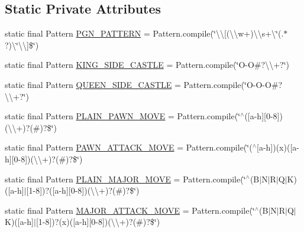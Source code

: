 \subsection*{Static Private Attributes}
\begin{DoxyCompactItemize}
\item 
static final Pattern \mbox{\hyperlink{classcom_1_1chess_1_1pgn_1_1_p_g_n_utilities_a8f958e8212e6a3b3079fc2ef9a319761}{P\+G\+N\+\_\+\+P\+A\+T\+T\+E\+RN}} = Pattern.\+compile(\char`\"{}\textbackslash{}\textbackslash{}\mbox{[}(\textbackslash{}\textbackslash{}w+)\textbackslash{}\textbackslash{}s+\textbackslash{}\char`\"{}(.$\ast$?)\textbackslash{}\char`\"{}\textbackslash{}\textbackslash{}\mbox{]}\$\char`\"{})
\item 
static final Pattern \mbox{\hyperlink{classcom_1_1chess_1_1pgn_1_1_p_g_n_utilities_a67582116b089ac50a96afca81e4deca0}{K\+I\+N\+G\+\_\+\+S\+I\+D\+E\+\_\+\+C\+A\+S\+T\+LE}} = Pattern.\+compile(\char`\"{}O-\/O\#?\textbackslash{}\textbackslash{}+?\char`\"{})
\item 
static final Pattern \mbox{\hyperlink{classcom_1_1chess_1_1pgn_1_1_p_g_n_utilities_a917072145ceea754cb8cd86d1683e19d}{Q\+U\+E\+E\+N\+\_\+\+S\+I\+D\+E\+\_\+\+C\+A\+S\+T\+LE}} = Pattern.\+compile(\char`\"{}O-\/O-\/O\#?\textbackslash{}\textbackslash{}+?\char`\"{})
\item 
static final Pattern \mbox{\hyperlink{classcom_1_1chess_1_1pgn_1_1_p_g_n_utilities_a638924016bd8ee5265515487b596a4e7}{P\+L\+A\+I\+N\+\_\+\+P\+A\+W\+N\+\_\+\+M\+O\+VE}} = Pattern.\+compile(\char`\"{}$^\wedge$(\mbox{[}a-\/h\mbox{]}\mbox{[}0-\/8\mbox{]})(\textbackslash{}\textbackslash{}+)?(\#)?\$\char`\"{})
\item 
static final Pattern \mbox{\hyperlink{classcom_1_1chess_1_1pgn_1_1_p_g_n_utilities_a92b5b12f318218f69e63facf7dc9017c}{P\+A\+W\+N\+\_\+\+A\+T\+T\+A\+C\+K\+\_\+\+M\+O\+VE}} = Pattern.\+compile(\char`\"{}($^\wedge$\mbox{[}a-\/h\mbox{]})(x)(\mbox{[}a-\/h\mbox{]}\mbox{[}0-\/8\mbox{]})(\textbackslash{}\textbackslash{}+)?(\#)?\$\char`\"{})
\item 
static final Pattern \mbox{\hyperlink{classcom_1_1chess_1_1pgn_1_1_p_g_n_utilities_a22e4496d721646d41bd1e21cb4176e3b}{P\+L\+A\+I\+N\+\_\+\+M\+A\+J\+O\+R\+\_\+\+M\+O\+VE}} = Pattern.\+compile(\char`\"{}$^\wedge$(B$\vert$N$\vert$R$\vert$Q$\vert$K)(\mbox{[}a-\/h\mbox{]}$\vert$\mbox{[}1-\/8\mbox{]})?(\mbox{[}a-\/h\mbox{]}\mbox{[}0-\/8\mbox{]})(\textbackslash{}\textbackslash{}+)?(\#)?\$\char`\"{})
\item 
static final Pattern \mbox{\hyperlink{classcom_1_1chess_1_1pgn_1_1_p_g_n_utilities_a862b21bcf5a71c5d8001d074ef6716ee}{M\+A\+J\+O\+R\+\_\+\+A\+T\+T\+A\+C\+K\+\_\+\+M\+O\+VE}} = Pattern.\+compile(\char`\"{}$^\wedge$(B$\vert$N$\vert$R$\vert$Q$\vert$K)(\mbox{[}a-\/h\mbox{]}$\vert$\mbox{[}1-\/8\mbox{]})?(x)(\mbox{[}a-\/h\mbox{]}\mbox{[}0-\/8\mbox{]})(\textbackslash{}\textbackslash{}+)?(\#)?\$\char`\"{})

\end{DoxyCompactItemize}
